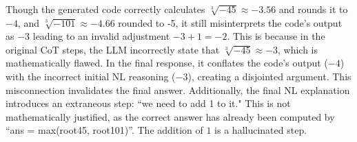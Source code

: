 Though the generated code correctly calculates $\sqrt[3]{-45}\approx-3.56$ and rounds it to $-4$, and $\sqrt[3]{-101}\approx-4.66$ rounded to -5, it still misinterprets the code’s output as $-3$ leading to an invalid adjustment $-3 + 1 = -2$. This is because in the original CoT steps, the LLM incorrectly state that $\sqrt[3]{-45}\approx-3$, which is mathematically flawed. In the final response, it conflates the code’s output ($-4$) with the incorrect initial NL reasoning ($-3$), creating a disjointed argument. This misconnection invalidates the final answer.
Additionally, the final NL explanation introduces an extraneous step: ``we need to add 1 to it." 
This is not mathematically justified, as the correct answer has already been computed by ``ans = max(root45, root101)''. The addition of $1$ is a hallucinated step.

